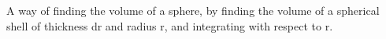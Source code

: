 A way of finding the volume of a sphere, by finding the volume of
a spherical shell of thickness dr and radius r, and integrating
with respect to r.